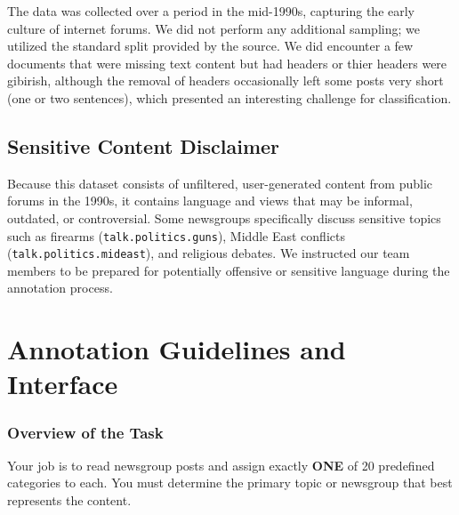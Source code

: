 \documentclass{article}
\begin{document}
The data was collected over a period in the mid-1990s, capturing the early culture of internet forums. We did not perform any additional sampling; we utilized the standard split provided by the source. We did encounter a few documents that were missing text content but had headers or thier headers were gibirish, although the removal of headers occasionally left some posts very short (one or two sentences), which presented an interesting challenge for classification.

\subsection{Sensitive Content Disclaimer}
Because this dataset consists of unfiltered, user-generated content from public forums in the 1990s, it contains language and views that may be informal, outdated, or controversial. Some newsgroups specifically discuss sensitive topics such as firearms (\texttt{talk.politics.guns}), Middle East conflicts (\texttt{talk.politics.mideast}), and religious debates. We instructed our team members to be prepared for potentially offensive or sensitive language during the annotation process.

\section{Annotation Guidelines and Interface}

\subsubsection{Overview of the Task}
Your job is to read newsgroup posts and assign exactly \textbf{ONE} of 20 predefined categories to each. You must determine the primary topic or newsgroup that best represents the content. 
\end{document}
